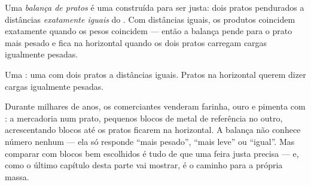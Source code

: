 \begin{definition}\label{def:g3:levers-and-scales:scale}
Uma \emph{balança de pratos} é uma 
construída para ser justa: dois pratos pendurados a distâncias
\emph{exatamente iguais} do . Com distâncias iguais, os
produtos coincidem exatamente quando os pesos coincidem --- então a
balança pende para o prato mais pesado e fica na horizontal quando os
dois pratos carregam cargas igualmente pesadas.
\end{definition}

\begin{omfigure}

{\small Uma : uma  com dois pratos a
distâncias iguais. Pratos na horizontal querem dizer cargas
igualmente pesadas.}
\end{omfigure}

\begin{example}\label{ex:g3:levers-and-scales:weighing}
Durante milhares de anos, os comerciantes venderam farinha, ouro e
pimenta com : a mercadoria num prato, pequenos
blocos de metal de referência no outro, acrescentando blocos até os
pratos ficarem na horizontal. A balança não conhece número nenhum ---
ela só responde ``mais pesado'', ``mais leve'' ou ``igual''. Mas
comparar com blocos bem escolhidos é tudo de que uma feira justa
precisa --- e, como o último capítulo desta parte vai mostrar, é o
caminho para  a própria massa.
\end{example}

